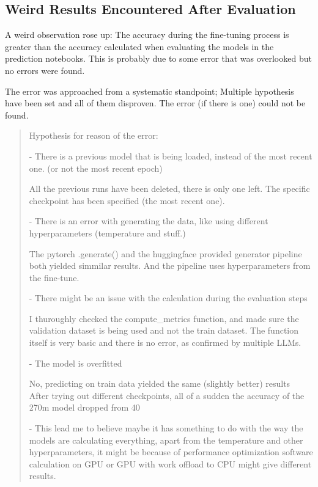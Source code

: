 \documentclass{article}
\begin{document}
\subsection{Weird Results Encountered After Evaluation}

A weird observation rose up: The accuracy during the fine-tuning process is 
greater than the accuracy calculated when evaluating the models in the 
prediction notebooks. This is probably due to some error that was overlooked 
but no errors were found.

The error was approached from a systematic standpoint; Multiple hypothesis 
have been set and all of them disproven. The error (if there is one) could 
not be found.

\begin{quote}
\footnotesize{
Hypothesis for reason of the error:
	
- There is a previous model that is being loaded, instead of the most recent one. (or not the most recent epoch)

All the previous runs have been deleted, there is only one left. The specific checkpoint has been specified (the most recent one).

- There is an error with generating the data, like using different hyperparameters (temperature and stuff.)

The pytorch .generate() and the huggingface provided generator pipeline both yielded simmilar results. And the pipeline uses hyperparameters from the fine-tune.

- There might be an issue with the calculation during the evaluation steps

I thuroughly checked the compute\_metrics function, and made sure the validation dataset is being used and not the train dataset. The function itself is very basic and there is no error, as confirmed by multiple LLMs.

- The model is overfitted

No, predicting on train data yielded the same (slightly better) results
\\[2em]	
After trying out different checkpoints, all of a sudden the accuracy of the 270m model dropped from 40%
	
- This lead me to believe maybe it has something to do with the way the models are calculating everything, apart from the temperature and other hyperparameters, it might be because of performance optimization software calculation on GPU or GPU with work offload to CPU might give different results.

}
\end{quote}
\end{document}

